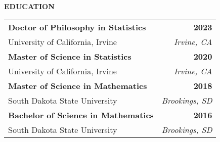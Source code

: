 %
\curriculumvitae
{

\textbf{EDUCATION}

  \begin{tabular*}{1\textwidth}{@{\extracolsep{\fill}}lr}
    \textbf{Doctor of Philosophy in Statistics} & \textbf{2023} \\
    \vspace{6pt}
    University of California, Irvine & \emph{Irvine, CA} \\
    \textbf{Master of Science in Statistics} & \textbf{2020} \\
    \vspace{6pt}
    University of California, Irvine & \emph{Irvine, CA} \\
    \textbf{Master of Science in Mathematics} & \textbf{2018} \\
    \vspace{6pt}
    South Dakota State University & \emph{Brookings, SD} \\
    \textbf{Bachelor of Science in Mathematics} & \textbf{2016} \\
    \vspace{6pt}
    South Dakota State University & \emph{Brookings, SD} \\
  \end{tabular*}





}
